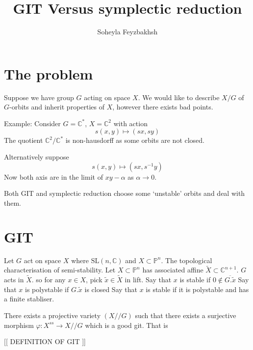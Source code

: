 % 


\title{GIT Versus symplectic reduction}
\author{Soheyla Feyzbakhsh}
\date{}

 
\maketitle
\section{The problem } %

Suppose we have group $G$ acting on space $X$. 
We would like to describe $ X/G $ of $ G$-orbits and inherit properties of $X$, 
however there exists bad points. 

Example: 
Consider $ G = \mathbb{C} ^* $, $ X = \mathbb{C} ^2 $ with action 
\begin{equation}
    s(x,y) \mapsto (sx, sy) 
\end{equation}
The quotient $ \mathbb{C} ^2 / \mathbb{C} ^* $ is non-hausdorff as some orbits are not closed. 

Alternatively suppose
\begin{equation}
    s(x,y) \mapsto (sx, s^{-1} y) 
\end{equation}
Now both axis are in the limit of $xy- \alpha $ as $\alpha \rightarrow 0 $.

Both GIT and symplectic reduction choose some `unstable' orbits and deal with them. 

\section{GIT} %


Let $ G$ act on space $X$ where $ \mathrm{SL} ( n , \mathbb{C} ) $ and $ X \subset \mathbb{P} ^n $.
The topological characterisation of semi-stability. 
Let $X \subset \mathbb{P} ^n $ has associated affine $ \tilde{X} \subset \mathbb{C} ^{n+1} $. 
$G$ acts in $ \tilde{X} $. 
so for any $ x \in X $, pick $ \tilde{x} \in \tilde{X} $ in lift.
Say that $x$ is stable if $0 \notin \overline{G . \tilde{x} } $
Say that $x$ is polystable if $G . \tilde{x}  $ is closed 
Say that $x$ is stable if it is polystable and has a finite stabliser.

\begin{theorem}
    There exists a projective variety $( X//G ) $ such that there exists a surjective morphism 
    $\varphi : X^{ss} \rightarrow X//G $ which is a good git. 
    That is 

    [[ DEFINITION OF GIT ]] 
\end{theorem}


